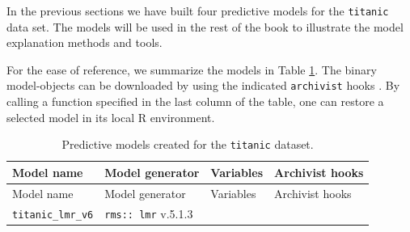 \documentclass[12pt,]{krantz}
\begin{document}
In the previous sections we have built four predictive models for the \texttt{titanic} data set. The models will be used in the rest of the book to illustrate the model explanation methods and tools.

For the ease of reference, we summarize the models in Table \ref{tab:archivistHooksOfModelsTitanic}. The binary model-objects can be downloaded by using the indicated \texttt{archivist} hooks \citep{archivist}. By calling a function specified in the last column of the table, one can restore a selected model in its local R environment.

\begin{longtable}[]{@{}llll@{}}
\caption{\label{tab:archivistHooksOfModelsTitanic} Predictive models created for the \texttt{titanic} dataset.}\tabularnewline
\toprule
\begin{minipage}[b]{0.21\columnwidth}\raggedright
Model name\strut
\end{minipage} & \begin{minipage}[b]{0.25\columnwidth}\raggedright
Model generator\strut
\end{minipage} & \begin{minipage}[b]{0.18\columnwidth}\raggedright
Variables\strut
\end{minipage} & \begin{minipage}[b]{0.25\columnwidth}\raggedright
Archivist hooks\strut
\end{minipage}\tabularnewline
\midrule
\endfirsthead
\toprule
\begin{minipage}[b]{0.21\columnwidth}\raggedright
Model name\strut
\end{minipage} & \begin{minipage}[b]{0.25\columnwidth}\raggedright
Model generator\strut
\end{minipage} & \begin{minipage}[b]{0.18\columnwidth}\raggedright
Variables\strut
\end{minipage} & \begin{minipage}[b]{0.25\columnwidth}\raggedright
Archivist hooks\strut
\end{minipage}\tabularnewline
\midrule
\endhead
\begin{minipage}[t]{0.21\columnwidth}\raggedright
\texttt{titanic\_lmr\_v6}\strut
\end{minipage} & \begin{minipage}[t]{0.25\columnwidth}\raggedright
\texttt{rms::\ lmr} v.5.1.3\strut
\end{minipage} & \begin{minipage}[t]{0.18\columnwidth}\raggedright

\end{minipage}
\end{longtable}
\end{document}
